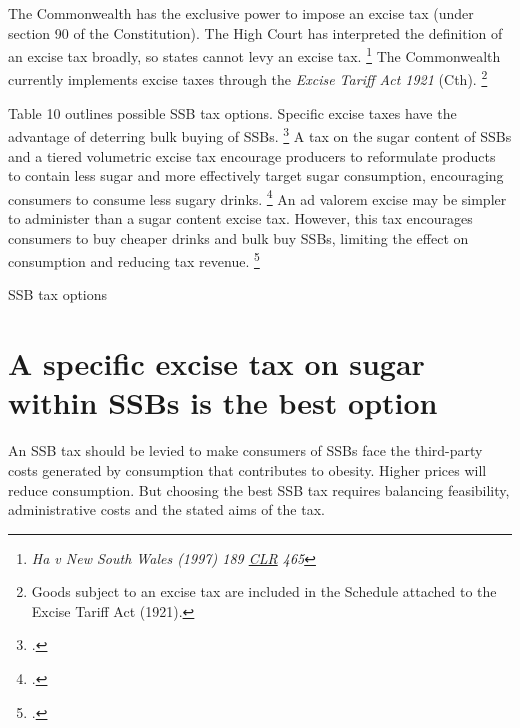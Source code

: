 \documentclass[embargoed]{grattan}
\begin{document}
The Commonwealth has the exclusive power to impose an excise tax (under section 90 of the Constitution).
The High Court has interpreted the definition of an excise tax broadly, so states cannot levy an excise tax.%
\footnote{\emph{Ha v New South Wales (1997) 189 \href{https://en.wikipedia.org/wiki/Commonwealth_Law_Reports}{CLR} 465 }} The Commonwealth currently implements excise taxes through the \emph{Excise Tariff Act 1921} (Cth).%
\footnote{Goods subject to an excise tax are included in the Schedule attached to the Excise Tariff Act (1921).}

Table 10 outlines possible SSB tax options.
Specific excise taxes have the advantage of deterring bulk buying of SSBs.%
\footcites{Sharma2014effectstaxingsugarsweetened}{Freebairn2010Taxationobesity}{Brownell2009publichealtheconomic}{Bonnet2013Taxincidencestrategic}{Wetter2016TaxingSugarSweetened}{Organization2016FiscalPoliciesDiet} A tax on the sugar content of SSBs and a tiered volumetric excise tax encourage producers to reformulate products to contain less sugar and more effectively target sugar consumption, encouraging consumers to consume less sugary drinks.%
\footcites{Smith2016SoftDrinksLevy}{Organization2016FiscalPoliciesDiet} An ad valorem excise may be simpler to administer than a sugar content excise tax.
However, this tax encourages consumers to buy cheaper drinks and bulk buy SSBs, limiting the effect on consumption and reducing tax revenue.%
\footcites{Powell2013Assessingpotentialeffectiveness}{Sharma2014effectstaxingsugarsweetened}{Brownell2009publichealtheconomic}{Organization2016FiscalPoliciesDiet}


\begin{table}
\caption{SSB tax options}




\end{table}

\section{A specific excise tax on sugar within SSBs is the best option}\label{a-specific-excise-tax-on-sugar-within-ssbs-is-the-best-option}

An SSB tax should be levied to make consumers of SSBs face the third-party costs generated by consumption that contributes to obesity.
Higher prices will reduce consumption.
But choosing the best SSB tax requires balancing feasibility, administrative costs and the stated aims of the tax.
\end{document}
